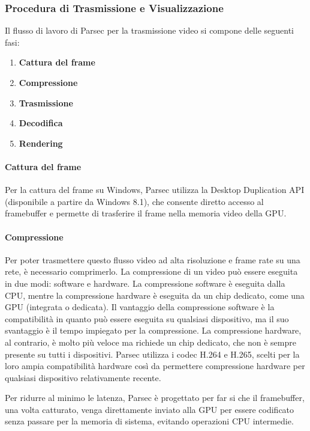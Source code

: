 \documentclass[12pt,a4paper,openright,twoside]{book}
\begin{document}
\subsubsection{Procedura di Trasmissione e Visualizzazione}

Il flusso di lavoro di Parsec per la trasmissione video si compone delle seguenti fasi:
\begin{enumerate}
    \item \textbf{Cattura del frame}
    \item \textbf{Compressione}
    \item \textbf{Trasmissione}
    \item \textbf{Decodifica}
    \item \textbf{Rendering}
\end{enumerate}

\paragraph{Cattura del frame}
Per la cattura del frame su Windows, Parsec utilizza la Desktop Duplication API (disponibile a partire da Windows 8.1), che consente diretto accesso al framebuffer e permette di trasferire il frame nella memoria video della GPU. 

\paragraph{Compressione}
Per poter trasmettere questo flusso video ad alta risoluzione e frame rate su una rete, è necessario comprimerlo. La compressione di un video può essere eseguita in due modi: software e hardware. La compressione software è eseguita dalla CPU, mentre la compressione hardware è eseguita da un chip dedicato, come una GPU (integrata o dedicata). Il vantaggio della compressione software è la compatibilità in quanto può essere eseguita su qualsiasi dispositivo, ma il suo svantaggio è il tempo impiegato per la compressione. La compressione hardware, al contrario, è molto più veloce ma richiede un chip dedicato, che non è sempre presente su tutti i dispositivi. Parsec utilizza i codec H.264 e H.265, scelti per la loro ampia compatibilità hardware così da permettere compressione hardware per qualsiasi dispositivo relativamente recente.

Per ridurre al minimo le latenza, Parsec è progettato per far si che il framebuffer, una volta catturato, venga direttamente inviato alla GPU per essere codificato senza passare per la memoria di sistema, evitando operazioni CPU intermedie.
\end{document}
